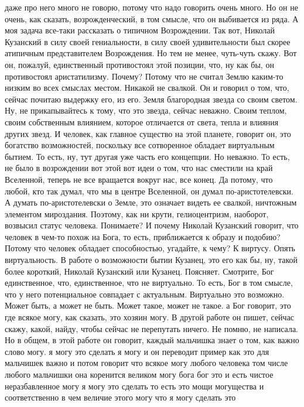даже про него много не говорю, потому что надо говорить очень много. Но он не
очень, как сказать, возрожденческий, в том смысле, что он выбивается из ряда. А
моя задача все-таки рассказать о типичном Возрождении. Так вот, Николай
Кузанский в силу своей гениальности, в силу своей удивительности был скорее
атипичным представителем Возрождения. Но тем не менее, чуть-чуть скажу. Вот он,
пожалуй, единственный противостоял этой позиции, что, ну как бы, он противостоял
аристатилизму. Почему? Потому что не считал Землю каким-то низким во всех
смыслах местом. Никакой не свалкой. Он и говорил о том, что, сейчас почитаю
выдержку его, из его. Земля благородная звезда со своим светом. Ну, не
прикапывайтесь к тому, что это звезда, сейчас неважно. Своим теплом, своим
собственным влиянием, которое отличается от света, тепла и влияния других звезд.
И человек, как главное существо на этой планете, говорит он, это богатство
возможностей, поскольку все сотворенное обладает виртуальным бытием. То есть,
ну, тут другая уже часть его концепции. Но неважно. То есть, не было в
возрождении вот этой вот идеи о том, что нас сместили на край Вселенной, теперь
не все вращается вокруг нас, все конец. Да потому, что любой, кто так думал, что
мы в центре Вселенной, он думал по-аристотелевски. А думать по-аристотелевски о
Земле, это означает видеть ее свалкой, ничтожным элементом мироздания. Поэтому,
как ни крути, гелиоцентризм, наоборот, возвысил статус человека. Понимаете? И
почему Николай Кузанский говорит, что человек в чем-то похож на Бога, то есть,
приближается к образу и подобию? Потому что человек обладает способностью,
угадайте, к чему? К виртусу. Опять виртуальность. В работе о возможности бытии
Кузанец, это его как бы, ну, такой более короткий, Николай Кузанский или
Кузанец. Поясняет. Смотрите, Бог единственное, что, единственное, что не
виртуально. То есть, Бог в том смысле, что у него потенциальное совпадает с
актуальным. Виртуально это возможно. Может быть, а может не быть. Может такое,
может не такое. а Бог говорит, это где всякое могу, как сказать, это хозяин
могу. В другой работе он пишет, сейчас скажу, какой, найду, чтобы сейчас не
перепутать ничего. Не помню, не написала. Но в общем, в этой работе он говорит,
каждый мальчишка знает о том, как важно слово могу. я могу это сделать я могу и
он переводит пример как это для мальчишек важно и потом говорит что всякое могу
любого человека том числе любого мальчишки она коренится великом могу бога бог
это и есть чистое неразбавленное могу я могу это сделать то есть это мощи
могущества и соответственно в чем величие этого могу что я могу сделать это
